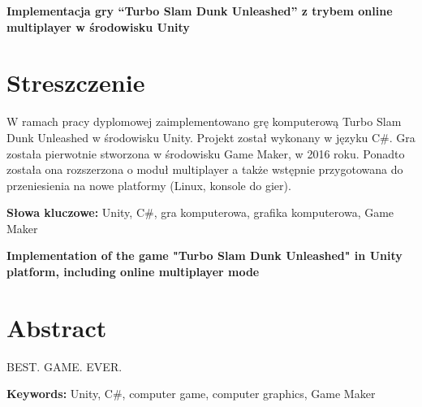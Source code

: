 \newpage
\begin{center}
\large \bf
Implementacja gry “Turbo Slam Dunk Unleashed” z trybem online multiplayer w środowisku Unity
\end{center}

\section*{Streszczenie}
W ramach pracy dyplomowej zaimplementowano grę komputerową Turbo Slam Dunk Unleashed w środowisku Unity. Projekt został wykonany w języku C\#. Gra została pierwotnie stworzona w środowisku Game Maker, w 2016 roku. Ponadto została ona rozszerzona o moduł multiplayer a także wstępnie przygotowana do przeniesienia na nowe platformy (Linux, konsole do gier).

\bigskip
{\noindent\bf Słowa kluczowe:} Unity, C\#, gra komputerowa, grafika komputerowa, Game Maker

\vskip 2cm


\begin{center}
\large \bf
Implementation of the game "Turbo Slam Dunk Unleashed" in Unity platform, including online multiplayer mode 
\end{center}

\section*{Abstract}
BEST. GAME. EVER.

\bigskip
{\noindent\bf Keywords:} Unity, C\#, computer game, computer graphics, Game Maker

\vfill